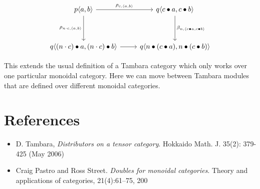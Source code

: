 \documentclass[11pt]{amsart}
\begin{document}
\[
 \begin{tikzcd}
 p \langle a, b \rangle
 \arrow[r, "{\rho_{c, \langle a, b \rangle}}"]
 \arrow[dd, "{\rho_{n \cdot c, \langle a, b \rangle}}"']
& q \langle c \bullet a, c \bullet b \rangle
 \arrow[dd, "{\beta_{n, \langle c \bullet a, c \bullet b \rangle}}"]
 \\
  \\
 q \langle (n \cdot c)  \bullet a, (n \cdot c) \bullet b \rangle
 \arrow[r, ""]
& q \langle n \bullet (c \bullet a), n \bullet (c \bullet b) \rangle
 \end{tikzcd}
\]

This extends the usual definition of a Tambara category which only works over one particular monoidal category. Here we can move between Tambara modules that are defined over different monoidal categories.

\section{References}

\begin{itemize}
\item D. Tambara, \emph{Distributors on a tensor category}. Hokkaido Math. J. 35(2): 379-425 (May 2006)

\item Craig Pastro and Ross Street. \emph{Doubles for monoidal categories}. Theory and
applications of categories, 21(4):61–75, 200
\end{itemize}
\end{document}
